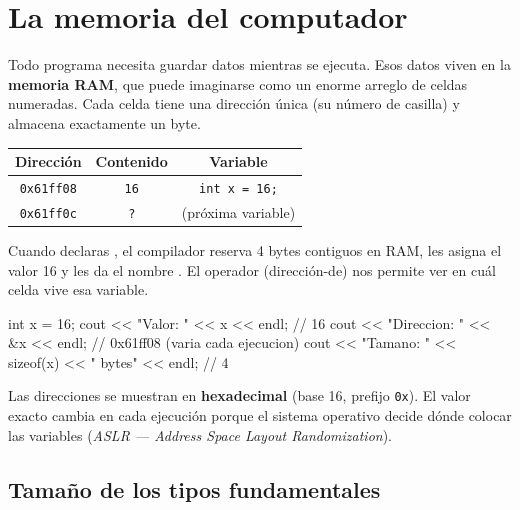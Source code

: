\documentclass[12pt, oneside]{article}
\begin{document}

\tableofcontents
\newpage

\section{La memoria del computador}

Todo programa necesita guardar datos mientras se ejecuta. Esos datos viven en
la \textbf{memoria RAM}, que puede imaginarse como un enorme arreglo de celdas
numeradas. Cada celda tiene una dirección única (su número de casilla) y
almacena exactamente un byte.

\begin{center}
\begin{tabular}{ccc}
  \toprule
  \textbf{Dirección} & \textbf{Contenido} & \textbf{Variable} \\
  \midrule
  \texttt{0x61ff08} & \texttt{16} & \texttt{int x = 16;} \\
  \texttt{0x61ff0c} & \texttt{?}  & (próxima variable) \\
  \bottomrule
\end{tabular}
\end{center}

Cuando declaras , el compilador reserva 4 bytes contiguos en
RAM, les asigna el valor 16 y les da el nombre . El operador \cpp{\&}
(dirección-de) nos permite ver en cuál celda vive esa variable.

\begin{codigo}[caption={Direccion de una variable}]
int x = 16;
cout << "Valor:     " << x  << endl;  // 16
cout << "Direccion: " << &x << endl;  // 0x61ff08  (varia cada ejecucion)
cout << "Tamano:    " << sizeof(x) << " bytes" << endl;  // 4
\end{codigo}

\begin{consejo}
  Las direcciones se muestran en \textbf{hexadecimal} (base 16, prefijo
  \texttt{0x}). El valor exacto cambia en cada ejecución porque el sistema
  operativo decide dónde colocar las variables (\textit{ASLR — Address Space
  Layout Randomization}).
\end{consejo}

\subsection{Tamaño de los tipos fundamentales}
\end{document}
